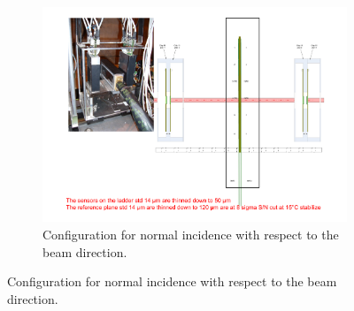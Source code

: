     \begin{figure}[!h]
      \centering
      \begin{subfigure}[t]{0.9\textwidth}
        \centering
        \includegraphics[width = 0.5 \textwidth]{Pictures/deformation/tb_cern_11_sketch_normal.pdf}
        \caption{Configuration for normal incidence with respect to the beam direction.}
        \label{fig:tbNormal}
      \end{subfigure}


\end{figure}
